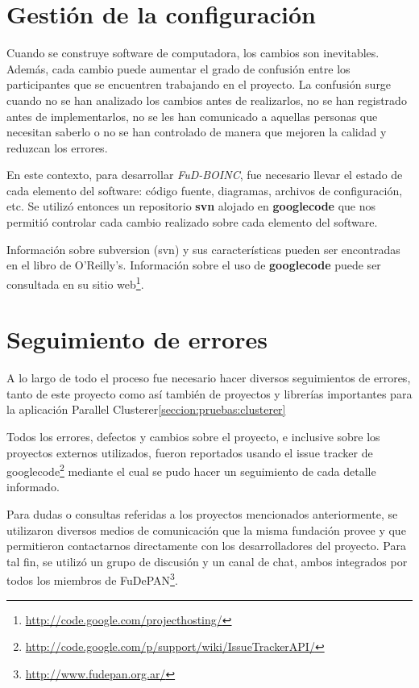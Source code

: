 \section{Gestión de la configuración}

Cuando se construye software de computadora, los cambios son inevitables. Además, cada cambio puede aumentar el grado de confusión entre los participantes que se encuentren trabajando en el proyecto. La confusión surge cuando no se han analizado los cambios antes de realizarlos, no se han registrado antes de implementarlos, no se les han comunicado a aquellas personas que necesitan saberlo o no se han controlado de manera que mejoren la calidad y reduzcan los errores.

En este contexto, para desarrollar \textit{FuD-BOINC}, fue necesario llevar el estado de cada elemento del software: código fuente, diagramas, archivos de configuración, etc. Se utilizó entonces un repositorio \textbf{svn} alojado en \textbf{googlecode} que nos permitió controlar cada cambio realizado sobre cada elemento del software. 

Información sobre subversion (svn) y sus características pueden ser encontradas en el libro de O'Reilly's\cite{svn}. Información sobre el uso de \textbf{googlecode} puede ser consultada en su sitio web\footnote{\url{http://code.google.com/projecthosting/}}.


\section{Seguimiento de errores}

A lo largo de todo el proceso fue necesario hacer diversos seguimientos de errores, tanto de este proyecto como así también de proyectos y librerías importantes para la aplicación Parallel Clusterer\ref{seccion:pruebas:clusterer}

Todos los errores, defectos y cambios sobre el proyecto, e inclusive sobre los proyectos externos utilizados, fueron reportados usando el issue tracker de googlecode\footnote{\url{http://code.google.com/p/support/wiki/IssueTrackerAPI/}} mediante el cual se pudo hacer un seguimiento de cada detalle informado. 

Para dudas o consultas referidas a los proyectos mencionados anteriormente, se utilizaron diversos medios de comunicación que la misma fundación provee y que permitieron contactarnos directamente con los desarrolladores del proyecto. Para tal fin, se utilizó un grupo de discusión y un canal de chat, ambos integrados por todos los miembros de FuDePAN\footnote{\url{http://www.fudepan.org.ar/}}.


